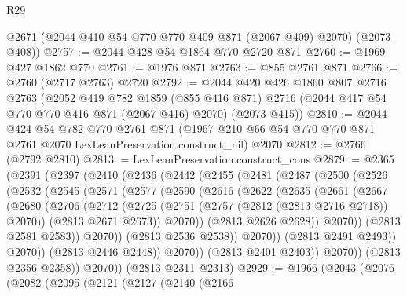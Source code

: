 \begin{lexlean}{R29}
\begin{coremodule}
      @2671
      (@2044 @410 @54 @770 @770 @409 @871 (@2067 @409) @2070)
      (@2073 @408))
@2757 := @2044 @428 @54 @1864 @770 @2720 @871
@2760 := @1969 @427 @1862 @770
@2761 := @1976 @871
@2763 := @855 @2761 @871
@2766 := @2760 (@2717 @2763) @2720
@2792 := @2044
    @420
    @426
    @1860
    @807
    @2716
    @2763
    (@2052
      @419
      @782
      @1859
      (@855 @416 @871)
      @2716
      (@2044 @417 @54 @770 @770 @416 @871 (@2067 @416) @2070)
      (@2073 @415))
@2810 := @2044
    @424
    @54
    @782
    @770
    @2761
    @871
    (@1967 @210 @66 @54 @770 @770 @871 @2761 @2070 LexLeanPreservation.construct_nil)
    @2070
@2812 := @2766 (@2792 @2810)
@2813 := LexLeanPreservation.construct_cons
@2879 := @2365
    (@2391
      (@2397
        (@2410
          (@2436
            (@2442
              (@2455
                (@2481
                  (@2487
                    (@2500
                      (@2526
                        (@2532
                          (@2545
                            (@2571
                              (@2577
                                (@2590
                                  (@2616
                                    (@2622
                                      (@2635
                                        (@2661
                                          (@2667
                                            (@2680
                                              (@2706
                                                (@2712
                                                  (@2725
                                                    (@2751
                                                      (@2757 (@2812 (@2813 @2716 @2718)) @2070))
                                                    (@2813 @2671 @2673))
                                                  @2070))
                                              (@2813 @2626 @2628))
                                            @2070))
                                        (@2813 @2581 @2583))
                                      @2070))
                                  (@2813 @2536 @2538))
                                @2070))
                            (@2813 @2491 @2493))
                          @2070))
                      (@2813 @2446 @2448))
                    @2070))
                (@2813 @2401 @2403))
              @2070))
          (@2813 @2356 @2358))
        @2070))
    (@2813 @2311 @2313)
@2929 := @1966
    (@2043
      (@2076
        (@2082
          (@2095
            (@2121
              (@2127
                (@2140
                  (@2166

\end{coremodule}
\end{lexlean}
